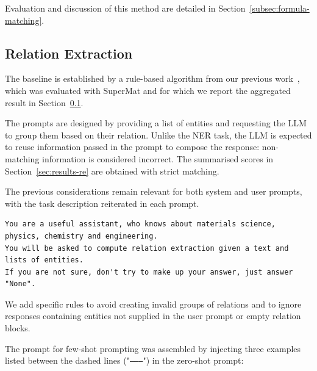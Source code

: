 Evaluation and discussion of this method are detailed in Section~\ref{subsec:formula-matching}.


\subsection{Relation Extraction}
\label{sec:re}
The baseline is established by a rule-based algorithm from our previous work~\cite{lfoppiano2023automatic}, which was evaluated with SuperMat and for which we report the aggregated result in Section~\ref{sec:re}. 

The prompts are designed by providing a list of entities and requesting the LLM to group them based on their relation. 
Unlike the NER task, the LLM is expected to reuse information passed in the prompt to compose the response: non-matching information is considered incorrect.
The summarised scores in Section~\ref{sec:results-re} are obtained with strict matching. 

The previous considerations remain relevant for both system and user prompts, with the task description reiterated in each prompt.

\begin{lstlisting}[caption=System prompt for RE modified by emphasising the tasks]
You are a useful assistant, who knows about materials science, physics, chemistry and engineering.
You will be asked to compute relation extraction given a text and lists of entities. 
If you are not sure, don't try to make up your answer, just answer "None". 
\end{lstlisting}

We add specific rules to avoid creating invalid groups of relations and to ignore responses containing entities not supplied in the user prompt or empty relation blocks. 


    

The prompt for few-shot prompting was assembled by injecting three examples listed between the dashed lines ("\texttt{--------}") in the zero-shot prompt:

